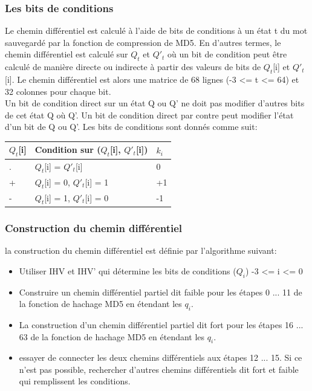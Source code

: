 \subsubsection{Les bits de conditions}
Le chemin différentiel est calculé à l'aide de bits de conditions à un état t du mot sauvegardé par la fonction de compression de MD5. En d'autres termes, le chemin différentiel est calculé sur $Q_t$ et $Q'_t$ où un bit de condition peut être calculé de manière directe ou indirecte à partir des valeurs de bits de $Q_t$[i] et $Q'_t$[i]. Le chemin différentiel est alors une matrice de 68 lignes (-3 <= t <= 64) et 32 colonnes pour chaque bit.\\

Un bit de condition direct sur un état Q ou Q' ne doit pas modifier d'autres bits de cet état Q où Q'. Un bit de condition direct par contre peut modifier l'état d'un bit de Q ou Q'. Les bits de conditions sont donnés comme suit:\\


\begin{tabular}{lll}
\hline
	$Q_t$[i] &\vline \hspace{.1cm} Condition sur ($Q_t$[i], $Q'_t$[i]) &\vline \hspace{.1cm} $k_i$ \\ \hline
	. &\vline \hspace{.1cm} $Q_t$[i] = $Q'_t$[i] &\vline \hspace{.1cm} 0 \\ \hline
	+ &\vline \hspace{.1cm} $Q_t$[i] = 0, $Q'_t$[i] = 1 &\vline \hspace{.1cm} +1 \\ \hline
	- &\vline \hspace{.1cm} $Q_t$[i] = 1, $Q'_t$[i] = 0 &\vline \hspace{.1cm} -1 \\ \hline
\end{tabular}

\subsubsection{Construction du chemin différentiel}
la construction du chemin différentiel est définie par l'algorithme suivant: 
\begin{itemize}
  \item Utiliser IHV et IHV' qui détermine les bits de conditions ($Q_i$) -3 <= i <= 0
  \item Construire un chemin différentiel partiel dit faible pour les étapes 0 ... 11 de la fonction de hachage MD5 en étendant les $q_i$.
  \item La construction d'un chemin différentiel partiel dit fort pour les étapes 16 ... 63 de la fonction de hachage MD5 en étendant les $q_i$.
    \item essayer de connecter les deux chemins différentiels aux étapes 12 ... 15. Si ce n'est pas possible, rechercher d'autres chemins différentiels dit fort et faible qui remplissent les conditions.
\end{itemize}

